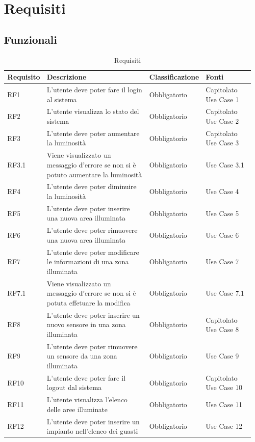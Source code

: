 \documentclass[12pt]{article}
\begin{document}
\section{Requisiti}
\subsection{Funzionali}
\begin{longtable}{ |p{1.8cm}|p{5.2cm}|p{3cm}| p{2cm}|}
\caption{Requisiti} \label{tab:tabellaRequisiti} \\
\hline
\textbf{Requisito} & \textbf{Descrizione} & \textbf{Classificazione} & \textbf{Fonti} \\
\hline
\endhead
\hline
\endfoot
RF1 & L'utente deve poter fare il login al sistema  & Obbligatorio & Capitolato Use Case 1 \\
RF2 & L'utente visualizza lo stato del sistema & Obbligatorio & Capitolato Use Case 2 \\
RF3 & L'utente deve poter aumentare la luminosità& Obbligatorio & Capitolato Use Case 3 \\
RF3.1 & Viene visualizzato un messaggio d'errore se non si è potuto aumentare la luminosità & Obbligatorio & Use Case 3.1 \\
RF4 & L'utente deve poter diminuire la luminosità & Obbligatorio & Use Case 4\\
RF5 & L'utente deve poter inserire una nuova area illuminata & Obbligatorio & Use Case 5 \\
RF6 & L'utente deve poter rimuovere una nuova area illuminata & Obbligatorio & Use Case 6\\
RF7 & L'utente deve poter modificare le informazioni di una zona illuminata & Obbligatorio & Use Case 7 \\
RF7.1 & Viene visualizzato un messaggio d'errore se non si è potuta effetuare la modifica & Obbligatorio & Use Case 7.1\\
RF8 & L'utente deve poter inserire un nuovo sensore in una zona illuminata & Obbligatorio & Capitolato Use Case 8 \\
RF9 & L'utente deve poter rimuovere un sensore da una zona illuminata & Obbligatorio & Use Case 9 \\
RF10 & L'utente deve poter fare il logout dal sistema & Obbligatorio & Capitolato Use Case 10 \\
RF11 & L'utente visualizza l'elenco delle aree illuminate& Obbligatorio & Use Case 11 \\
RF12 & L'utente deve poter inserire un impianto nell'elenco dei guasti& Obbligatorio & Use Case 12 \\

\end{longtable}
\end{document}
